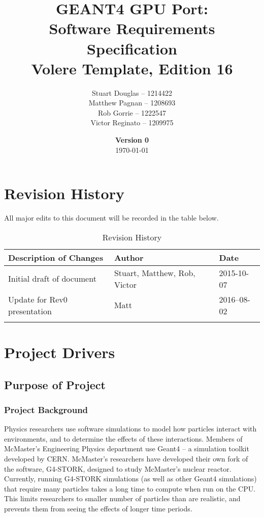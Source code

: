 \documentclass[12pt]{article}
\title{
\LARGE GEANT4 GPU Port:
\\\vspace{10mm}
\large \textbf{Software Requirements Specification}
\\Volere Template, Edition 16
\vspace{40mm}
}
\author{
Stuart Douglas -- 1214422
\\Matthew Pagnan -- 1208693
\\Rob Gorrie -- 1222547
\\Victor Reginato -- 1209975
\vspace{10mm}
}
\date{\vfill \textbf{Version 0}\\ \today}
\begin{document}

\maketitle
\newpage

\tableofcontents
\newpage
{}
\restoregeometry

\section{Revision History}
All major edits to this document will be recorded in the table below.

\begin{table}[h]
\centering
\caption{Revision History}
\begin{tabular}{|l|l|l|}
\Xhline{2\arrayrulewidth}
\bf Description of Changes & \bf Author & \bf Date\\\hline
Initial draft of document & Stuart, Matthew, Rob, Victor & 2015-10-07\\
Update for Rev0 presentation & Matt & 2016--08-02\\
\Xhline{2\arrayrulewidth}
\end{tabular}
\end{table}

\section{Project Drivers}

\subsection{Purpose of Project} %
\subsubsection{Project Background}
Physics researchers use software simulations to model how particles interact with environments, and to determine the effects of these interactions. Members of McMaster's Engineering Physics department use Geant4 -- a simulation toolkit developed by CERN. McMaster's researchers have developed their own fork of the software, G4-STORK, designed to study McMaster's nuclear reactor. Currently, running G4-STORK simulations (as well as other Geant4 simulations) that require many particles takes a long time to compute when run on the CPU. This limits researchers to smaller number of particles than are realistic, and prevents them from seeing the effects of longer time periods.
\end{document}
